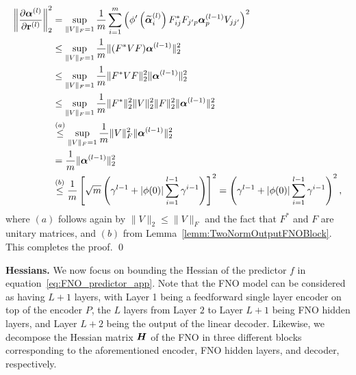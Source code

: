     \begin{align*}
        \left\|\frac{\partial \boldsymbol{\alpha}^{(l)}}{\partial \mathbf{r}^{(l)}}\right\|_2^2
        &=
        \sup _{\|V\|_F=1} \frac{1}{m} \sum_{i=1}^m\left(\phi^{\prime}\left(\widetilde{\boldsymbol{\alpha}}_i^{(l)}\right) 
        F^*_{ij}F_{j'p}\boldsymbol{\alpha}^{(l-1)}_p
        V_{j j^{\prime}}\right)^2\\
        &\leq \sup_{\|V\|_F = 1} \frac{1}{m} \| (F^*VF)\boldsymbol{\alpha}^{(l-1)}\|_2^2\\
        & \leq \sup_{\|V\|_F = 1}\frac{1}{m} \|F^*VF\|_2^2 \|\boldsymbol{\alpha}^{(l-1)}\|_2^2 \\ 
        & \leq \sup_{\|V\|_F = 1}\frac{1}{m} \|F^*\|^2_2 \|V\|_2^2 \|F\|_2^2  \|\boldsymbol{\alpha}^{(l-1)}\|_2^2 \\ 
        & \overset{(a)}{\leq} \sup_{\|V\|_F = 1}\frac{1}{m} \|V\|_F^2 \|\boldsymbol{\alpha}^{(l-1)}\|_2^2 \\
        & = \frac{1}{m}\|\boldsymbol{\alpha}^{(l-1)}\|_2^2 \\
        & \overset{(b)}{\leq} \frac{1}{m} \left[ 
            \sqrt{m}\left(\gamma^{l-1}+|\phi(0)| \sum_{i=1}^{l-1} \gamma^{i-1}\right)
        \right]^2 = \left(\gamma^{l-1}+|\phi(0)| \sum_{i=1}^{l-1} \gamma^{i-1}\right)^2,
    \end{align*}
    where $(a)$ follows again by $\|V\|_2 \leq \|V\|_F$ and the fact that $F^*$ and $F$ are unitary matrices, and $(b)$ from Lemma~\ref{lemm:TwoNormOutputFNOBlock}. This completes the proof. \qed


\textbf{Hessians.} We now focus on bounding the Hessian of the predictor $f$ in equation~\eqref{eq:FNO_predictor_app}. Note that the FNO model can be considered as having $L+1$ layers, with Layer 1 being a feedforward single layer encoder on top of the encoder $P$, the $L$ layers from Layer $2$ to Layer $L+1$ being FNO hidden layers, and Layer $L+2$ being the output of the linear decoder.
%
%
Likewise, we decompose the Hessian matrix ${\bm{H}}$ of the FNO in three different blocks corresponding to the aforementioned encoder, FNO hidden layers, and decoder, respectively.

